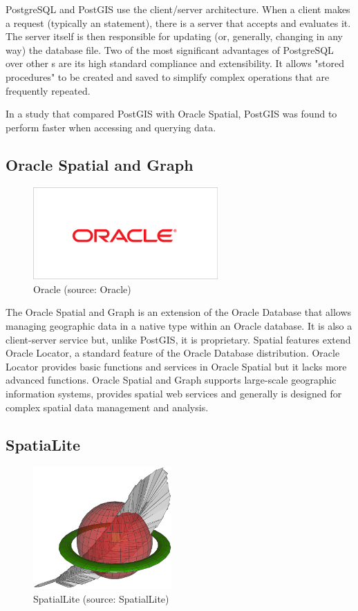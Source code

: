 PostgreSQL and PostGIS use the client/server architecture. \cite{postgre} When a
client makes a request (typically an  statement), there is a server
that accepts and evaluates it. The server itself is then responsible
for updating (or, generally, changing in any way) the database
file. Two of the most significant advantages of PostgreSQL over other
s are its high standard compliance and extensibility. It allows
"stored procedures" to be created and saved to simplify complex
operations that are frequently repeated.

In a study that compared PostGIS with Oracle Spatial, PostGIS was
found to perform faster when accessing and querying
data. \cite{postgis}

	
\subsection{Oracle Spatial and Graph}

\begin{figure}[H] \centering
      \includegraphics[width=200pt]{./pictures/oracle.png}
      \caption[Oracle logo]{Oracle (source: Oracle)}
      \label{fig:Oracle}
  \end{figure}
  
  
The Oracle Spatial and Graph is an extension of the Oracle Database
that allows managing geographic data in a native type within an Oracle
database. It is also a client-server service \cite{oraclearch} but, unlike PostGIS, it
is proprietary. Spatial features extend Oracle Locator, a standard
feature of the Oracle Database distribution. Oracle Locator provides
basic functions and services in Oracle Spatial but it lacks more
advanced functions. Oracle Spatial and Graph supports large-scale
geographic information systems, provides spatial web services and
generally is designed for complex spatial data management and
analysis.

\subsection{SpatiaLite}

\begin{figure}[H] \centering
      \includegraphics[width=150pt]{./pictures/spatialite.png}
      \caption[SpatialLite logo]{SpatialLite (source: SpatialLite)}
      \label{fig:SpatialLite}
  \end{figure}
  

